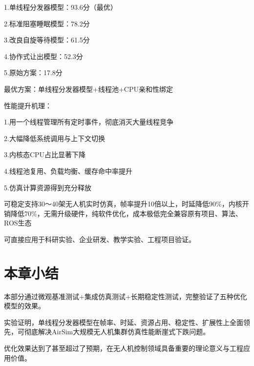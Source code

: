 1.单线程分发器模型：93.6分（最优）

2.标准阻塞睡眠模型：78.2分

3.改良自旋等待模型：61.5分

4.协作式让出模型：52.3分

5.原始方案：17.8分

最优方案：单线程分发器模型+线程池+CPU亲和性绑定

性能提升机理：

1.用一个线程管理所有定时事件，彻底消灭大量线程竞争

2.大幅降低系统调用与上下文切换

3.内核态CPU占比显著下降

4.线程池复用、负载均衡、缓存命中率提升

5.仿真计算资源得到充分释放

可稳定支持30～40架无人机实时仿真，帧率提升10倍以上，时延降低90\%，内核开销降低70\%，无需升级硬件，纯软件优化，成本极低完全兼容原有项目、算法、ROS生态

可直接应用于科研实验、企业研发、教学实验、工程项目验证。

\section{本章小结}

本部分通过微观基准测试+集成仿真测试+长期稳定性测试，完整验证了五种优化模型的效果。

实验证明，单线程分发器模型在帧率、时延、资源占用、稳定性、扩展性上全面领先，可彻底解决AirSim大规模无人机集群仿真性能断崖式下跌问题。

优化效果达到了甚至超过了预期，在无人机控制领域具备重要的理论意义与工程应用价值。
